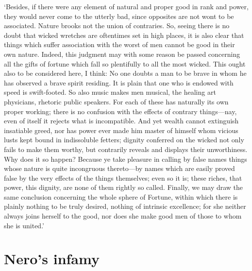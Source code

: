 \documentclass[12pt]{book}
\begin{document}
`Besides, if there were any element of natural and proper good in rank
and power, they would never come to the utterly bad, since opposites are
not wont to be associated. Nature brooks not the union of contraries.
So, seeing there is no doubt that wicked wretches are oftentimes set in
high places, it is also clear that things which suffer association with
the worst of men cannot be good in their own nature. Indeed, this
judgment may with some reason be passed concerning all the gifts of
fortune which fall so plentifully to all the most wicked. This ought
also to be considered here, I think: No one doubts a man to be brave in
whom he has observed a brave spirit residing. It is plain that one who
is endowed with speed is swift-footed. So also music makes men musical,
the healing art physicians, rhetoric public speakers. For each of these
has naturally its own proper working; there is no confusion with the
effects of contrary things---nay, even of itself it rejects what is
incompatible. And yet wealth cannot extinguish insatiable greed, nor has
power ever made him master of himself whom vicious lusts kept bound in
indissoluble fetters; dignity conferred on the wicked not only fails to
make them worthy, but contrarily reveals and displays their
unworthiness. Why does it so happen? Because ye take pleasure in calling
by false names things whose nature is quite incongruous thereto---by
names which are easily proved false by the very effects of the things
themselves; even so it is; these riches, that power, this dignity, are
none of them rightly so called. Finally, we may draw the same conclusion
concerning the whole sphere of Fortune, within which there is plainly
nothing to be truly desired, nothing of intrinsic excellence; for she
neither always joins herself to the good, nor does she make good men of
those to whom she is united.'




\section{Nero's infamy}
\end{document}
